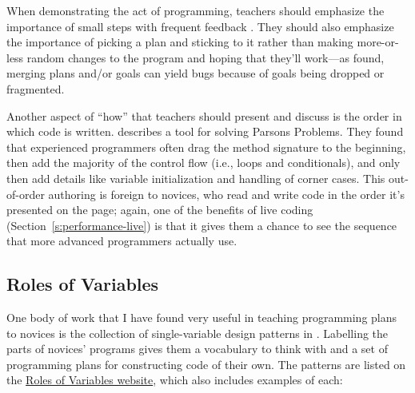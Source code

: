 When demonstrating the act of programming, teachers should emphasize the
importance of small steps with frequent feedback \cite{Blik2014}.
They should also emphasize the importance of picking a plan and sticking
to it rather than making more-or-less random changes to the program and
hoping that they'll work---as \cite{Spoh1985} found, merging plans
and/or goals can yield bugs because of goals being dropped or
fragmented.

Another aspect of ``how'' that teachers should present and discuss is the
order in which code is written. \cite{Ihan2011} describes a tool for
solving Parsons Problems. They found that experienced programmers often
drag the method signature to the beginning, then add the majority of the
control flow (i.e., loops and conditionals), and only then add details
like variable initialization and handling of corner cases. This
out-of-order authoring is foreign to novices, who read and write code in
the order it's presented on the page; again, one of the benefits of live
coding (Section~\ref{s:performance-live}) is that it gives them a chance
to see the sequence that more advanced programmers actually use.

\subsection{Roles of Variables}\label{roles-of-variables}

One body of work that I have found very useful in teaching programming
plans to novices is the collection of single-variable design patterns
in \cite{Kuit2004,Byck2005,Saja2006}. Labelling
the parts of novices' programs gives them a vocabulary to think with
and a set of programming plans for constructing code of their own. The
patterns are listed on the \href{http://saja.kapsi.fi/var\_roles/}{Roles of Variables
website}, which also includes examples of each:

